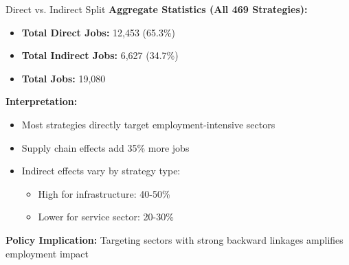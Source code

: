 \documentclass[10pt]{beamer}
\begin{document}
\begin{frame}{Direct vs. Indirect Split}
\textbf{Aggregate Statistics (All 469 Strategies):}

\vspace{0.5cm}

\begin{itemize}
    \item \textbf{Total Direct Jobs:} 12,453 (65.3\%)
    \item \textbf{Total Indirect Jobs:} 6,627 (34.7\%)
    \item \textbf{Total Jobs:} 19,080
\end{itemize}

\vspace{0.5cm}

\textbf{Interpretation:}
\begin{itemize}
    \item Most strategies directly target employment-intensive sectors
    \item Supply chain effects add 35\% more jobs
    \item Indirect effects vary by strategy type:
    \begin{itemize}
        \item High for infrastructure: 40-50\%
        \item Lower for service sector: 20-30\%
    \end{itemize}
\end{itemize}

\vspace{0.5cm}

\textbf{Policy Implication:} Targeting sectors with strong backward linkages amplifies employment impact
\end{frame}

\end{document}
